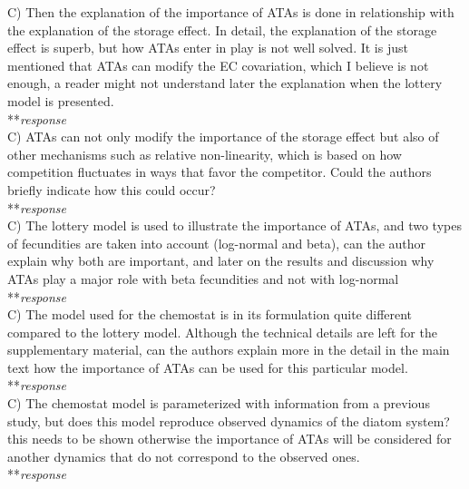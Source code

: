 \documentclass[letterpaper,11pt]{article}
\begin{document}
\noindent C) Then the explanation of the importance of ATAs is done in relationship with the explanation of the storage effect. In detail, the explanation of the storage effect is superb, but how ATAs enter in play is not well solved. It is just mentioned that ATAs can modify the EC covariation, which I believe is not enough, a reader might not understand later the explanation when the lottery model is presented. \\

\noindent ***\emph{response} \\

\noindent C) ATAs can not only modify the importance of the storage effect but also of other mechanisms such as relative non-linearity, which is based on how competition fluctuates in ways that favor the competitor. Could the authors briefly indicate how this could occur? \\

\noindent ***\emph{response} \\

\noindent C) The lottery model is used to illustrate the importance of ATAs, and two types of fecundities are taken into account (log-normal and beta), can the author explain why both are important, and later on the results and discussion why ATAs play a major role with beta fecundities and not with log-normal \\

\noindent ***\emph{response} \\

\noindent C) The model used for the chemostat is in its formulation quite different compared to the lottery model. Although the technical details are left for the supplementary material, can the authors explain more in the detail in the main text how the importance of ATAs can be used for this particular model. \\

\noindent ***\emph{response} \\

\noindent C) The chemostat model is parameterized with information from a previous study, but does this model reproduce observed dynamics of the diatom system? this needs to be shown otherwise the importance of ATAs will be considered for another dynamics that do not correspond to the observed ones. \\

\noindent ***\emph{response} \\
\end{document}

